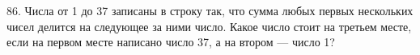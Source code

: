 86. Числа от 1 до 37 записаны в строку так, что сумма любых первых нескольких чисел делится на следующее за ними число. Какое число стоит на третьем месте, если на первом месте написано число 37, а на втором --- число 1?\\
